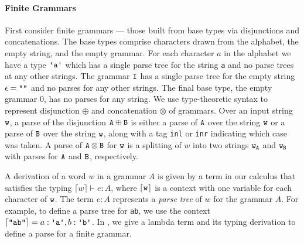 \documentclass[acmsmall,nonacm]{acmart}
\newcommand{\literal}[1]{\texttt{\textquotesingle#1\textquotesingle}}
\newcommand{\stringquote}[1]{\texttt{\textquotedbl#1\textquotedbl}}
\newcommand{\internalize}[1]{\lceil#1\rceil}
\begin{document}
\paragraph{Finite Grammars}
First consider finite grammars --- those built from base types via disjunctions and
concatenations. The base types comprise characters drawn from the alphabet, the
empty string, and the empty grammar.
For each character $a$ in the alphabet we have a type $\literal a$ which
has a single parse tree for the string
\stringquote{a} and no parse trees at any other strings. The grammar $\texttt{I}$ has a single
parse tree for the empty string $\epsilon = \stringquote{}$ and no parses for any other strings.
The final base type, the empty grammar $0$, has no parses for any string. We
use type-theoretic syntax to represent disjunction $\oplus$ and concatenation
$\otimes$ of
grammars. Over an input string $\texttt{w}$, a parse of the disjunction $\texttt{A} \oplus \texttt{B}$ is either
a parse of $\texttt{A}$ over the string $\texttt{w}$ or a
parse of $\texttt{B}$ over the string $\texttt{w}$, along with a tag \texttt{inl} or \texttt{inr} indicating which case was taken. A parse of $\texttt{A} \otimes \texttt{B}$ for
$\texttt{w}$ is a splitting of $w$ into two strings $\texttt{w}_{\texttt{A}}$ and $\texttt{w}_{\texttt{B}}$ with
parses for $\texttt{A}$
and $\texttt{B}$, respectively.

A derivation of a word $w$ in a grammar $A$ is given by a term in our calculus that satisfies the typing
$\internalize{w} \vdash e : A$,
where $\internalize \w$ is a context with one variable for each character of
$\texttt{w}$. The term $e : A$ represents a \emph{parse tree} of $w$ for the grammar $A$. For
example, to define a parse tree for \stringquote{ab}, we use
the context $\internalize{\stringquote{ab}} = a : \literal a , b :
\literal b$. In , we give a lambda term and its
typing derivation to define a parse for a finite grammar.
\end{document}
